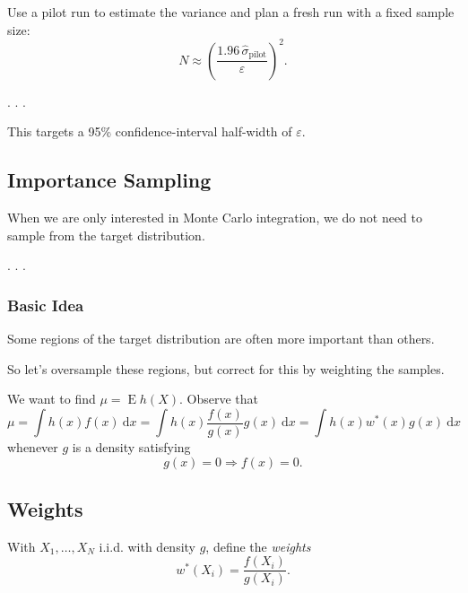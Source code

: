 \documentclass[
  letterpaper,
  DIV=11,
  numbers=noendperiod]{scrartcl}
\begin{document}
Use a pilot run to estimate the variance and plan a \alert{fresh run}
with a fixed sample size: \[
  N
  \approx \left( \frac{1.96\,\hat{\sigma}_{\mathrm{pilot}}}{\varepsilon} \right)^2.
\]

. . .

This targets a 95\% confidence-interval half-width of \(\varepsilon\).


\subsection{Importance Sampling}\label{importance-sampling-1}

When we are only interested in Monte Carlo integration, we do not need
to sample from the target distribution.

. . .

\subsubsection{Basic Idea}\label{basic-idea}

Some regions of the target distribution are often more important than
others.

\medskip\pause

So let's \alert{oversample} these regions, but correct for this by
\alert{weighting} the samples.

\medskip\pause

We want to find \(\mu = \operatorname{E}h(X)\). Observe that \[
  \mu = \int h(x) f(x) \ \mathrm{d}x
      = \int h(x) \frac{f(x)}{g(x)} g(x) \ \mathrm{d}x
      = \int h(x) w^*(x) g(x) \ \mathrm{d}x
\] whenever \(g\) is a density satisfying \[
  g(x) = 0 \Rightarrow f(x) = 0.
\]

\subsection{Weights}\label{weights}

With \(X_1, \ldots, X_N\) i.i.d. with density \(g\), define the
\emph{weights} \[
  w^*(X_i) = \frac{f(X_i)}{g(X_i)}.
\]
\end{document}
